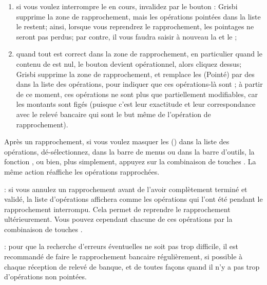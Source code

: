 \begin{enumerate}
\begin{itemize}
	\end{itemize}
	Si ce n'est pas le cas, c'est qu'il s'est glissé une erreur quelque part dans une opération, dans un solde ou ailleurs;
	\item si vous voulez interrompre le  en cours, invalidez par le bouton : Grisbi supprime la zone de rapprochement, mais les opérations pointées dans la liste le restent; ainsi, lorsque vous reprendrez le rapprochement, les pointages ne seront pas perdus; par contre, il vous faudra saisir à nouveau la  et le ;
	\item quand tout est correct dans la zone de rapprochement, en particulier quand le contenu de  est nul, le bouton  devient opérationnel, alors cliquez dessus; Grisbi supprime la zone de rapprochement, et remplace les  (Pointé) par des  dans la liste des opérations, pour indiquer que ces opérations-là sont ; à partir de ce moment, ces opérations ne sont plus que partiellement modifiables, car les montants sont figés (puisque c'est leur exactitude et leur correspondance avec le relevé bancaire qui sont le but même de l'opération de rapprochement).
\end{enumerate}

Après un rapprochement, si vous voulez masquer les  () dans la liste des opérations, dé-sélectionnez, dans la barre de menus ou dans la barre d'outils, la fonction , ou bien, plus simplement, appuyez sur la combinaison de touches . La même action réaffiche les opérations rapprochées.

\Note{}: si vous annulez un rapprochement avant de l'avoir complètement terminé et validé, la liste d'opérations affichera comme  les opérations qui l'ont été pendant le rapprochement interrompu. Cela permet de reprendre le rapprochement ultérieurement. Vous pouvez cependant chacune de ces opérations par la combinaison de touches .

\Note{}: pour que la recherche d'erreurs éventuelles ne soit pas trop difficile, il est recommandé de faire le rapprochement bancaire régulièrement, si possible à chaque réception de relevé de banque, et de toutes façons quand il n'y a pas trop d'opérations non pointées.


